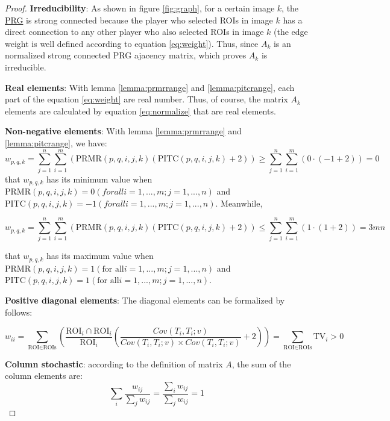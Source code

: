 \begin{proof}
\textbf{Irreducibility}: As shown in figure \ref{fig:graph}, for a certain image $k$, 
the \hyperref[abbr:prg]{PRG} is strong connected because the
player who selected ROIs in image $k$ has a direct connection to any other player who also selected ROIs in image $k$ 
(the edge weight is well defined according to equation \ref{eq:weight}).
Thus, since $A_k$ is an normalized strong connected PRG ajacency matrix, which proves $A_k$ is irreducible.

\textbf{Real elements}: With lemma \ref{lemma:prmrrange} and \ref{lemma:pitcrange}, each part of the equation \ref{eq:weight} 
are real number. Thus, of course, the matrix $A_k$ elements are calculated by equation \ref{eq:normalize} that are real elements.

\textbf{Non-negative elements}: With lemma \ref{lemma:prmrrange} and \ref{lemma:pitcrange}, we have:
\[
w_{p,q,k} = 
\sum_{j=1}^{n}{
\sum_{i=1}^{m}{ \left(
  \text{PRMR}(p, q, i, j, k)
  \left(
    \text{PITC}(p, q, i, j, k) + 2
  \right)
\right)}} 
\geq
\sum_{j=1}^{n}{
\sum_{i=1}^{m}{ \left(
  0 \cdot
  \left(
    -1 + 2
  \right)
\right)}} = 0
\]
that $w_{p,q,k}$ has its minimum value when $\text{PRMR}(p, q, i, j, k) = 0 (for all i=1,...,m; j=1,...,n)$ 
and $\text{PITC}(p, q, i, j, k) = -1 (for all i=1,...,m; j=1,...,n)$. Meanwhile,

\[
w_{p,q,k} = 
\sum_{j=1}^{n}{
\sum_{i=1}^{m}{ \left(
  \text{PRMR}(p, q, i, j, k)
  \left(
    \text{PITC}(p, q, i, j, k) + 2
  \right)
\right)}} 
\leq 
\sum_{j=1}^{n}{
\sum_{i=1}^{m}{ \left(
  1 \cdot
  \left(
    1 + 2
  \right)
\right)}} = 3mn
\]

that $w_{p,q,k}$ has its maximum value when $\text{PRMR}(p, q, i, j, k) = 1 (\text{for all} i=1,...,m; j=1,...,n)$ 
and $\text{PITC}(p, q, i, j, k) = 1 (\text{for all} i=1,...,m; j=1,...,n)$.
  
\textbf{Positive diagonal elements}: The diagonal elements can be formalized by follows:

\[
w_{ii} = 
\sum_{\text{ROI}\in\text{ROIs}}{\left(
  \frac{\text{ROI}_i\cap\text{ROI}_i}{\text{ROI}_i}
  \left( \frac{Cov(T_i, T_i; v)}
      {Cov(T_i, T_i; v)\times Cov(T_i, T_i; v)} + 2 \right)\right)
} = \sum_{\text{ROI}\in\text{ROIs}}{\text{TV}_i} > 0
\]

\textbf{Column stochastic}: according to the definition of matrix $A$, the sum of the column
elements are:
\[
  \sum_{i}{\frac{w_{ij}}{\sum_{j}{w_{ij}}}} 
  = \frac{\sum_{i}{w_{ij}}}{\sum_{j}{w_{ij}}} = 1
\]
\end{proof}

